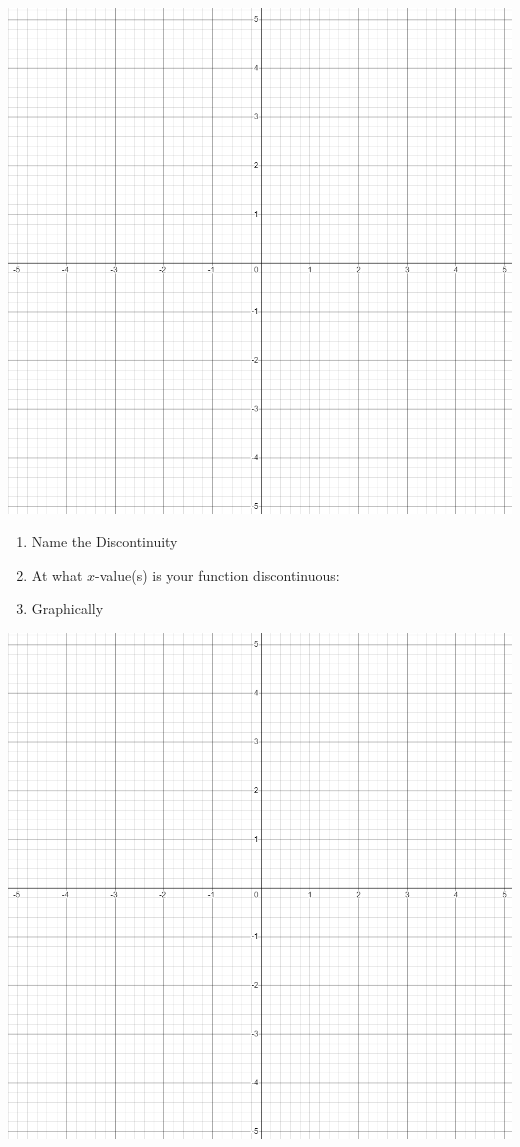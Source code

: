 \documentclass[12pt]{report}
\begin{document}
\begin{minipage}{0.48\textwidth}
     \centering
     \includegraphics[width=.9\linewidth]{emptyplot.png}
     \begin{enumerate}[label=\alph*.]
         \item Name the Discontinuity
         \item At what $x$-value(s) is your function discontinuous: 
         \item Graphically 
     \end{enumerate}
   \end{minipage}\hfill
   \begin{minipage}{0.48\textwidth}
     \centering
     \includegraphics[width=.9\linewidth]{emptyplot.png}
   \end{minipage}
\end{document}
